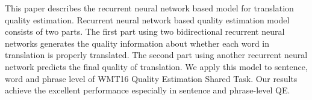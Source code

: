 This paper describes the recurrent neural network based model for translation quality estimation. Recurrent neural network based quality estimation model consists of two parts. The first part using two bidirectional recurrent neural networks generates the quality information about whether each word in translation is properly translated. The second part using another recurrent neural network predicts the final quality of translation. We apply this model to sentence, word and phrase level of WMT16 Quality Estimation Shared Task. Our results achieve the excellent performance especially in sentence and phrase-level QE.
